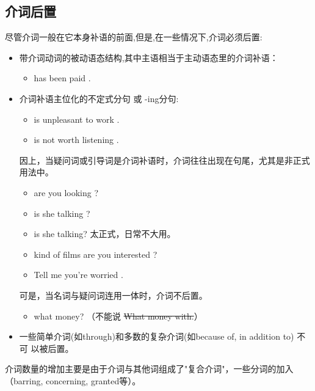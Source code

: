 \subsection{介词后置}

尽管介词一般在它本身补语的前面,但是,在一些情况下,介词必须后置:
\begin{itemize}
\item 带介词动词的被动语态结构,其中主语相当于主动语态里的介词补语：
  \begin{itemize}
  \item {} has been paid .
  \end{itemize}

\item 介词补语主位化的不定式分句 或 -ing分句:
  \begin{itemize}
  \item {} is unpleasant to work .

  \item {} is not worth listening .
  \end{itemize}

  因上，当疑问词或引导词是介词补语时，介词往往出现在句尾，尤其是非正式用法中。
  \begin{itemize}
  \item {} are you looking ?
  \item {} is she talking ?
  \item {} is she talking? 太正式，日常不大用。
  \item {} kind of films are you interested ?
  \item Tell me  you're worried .
  \end{itemize}

  可是，当名词与疑问词连用一体时，介词不后置。
  \begin{itemize}
  \item {} what money? （不能说 \sout{What money with.}）
  \end{itemize}

\item 一些简单介词(如through)和多数的复杂介词(如because of, in addition to) 不可
  以被后置。

\end{itemize}

介词数量的增加主要是由于介词与其他词组成了"复合介词"，一些分词的加入
（barring, concerning, granted等）。

